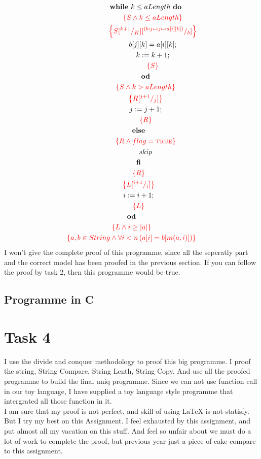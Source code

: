 \documentclass[a4paper,12pt,fleqn]{scrartcl}
\newcommand{\assn}[1]{{\color{red}\left\{#1\right\}}}
\newcommand{\variant}[3]{(#1:#2\mapsto #3)}
\newcommand{\whatever}[4]{\variant{#1}{#2\mapsto #3}{#4}}
\newcommand{\length}[1]{\left|#1\right|}
\begin{document}
\begin{gather}
    \qquad \qquad \WHILE ~k \leq aLength~ \DO\\ 
    \qquad \qquad \qquad \assn{S \And k \leq aLength}\\
    \qquad \qquad \qquad \assn{S \subst{k+1}{K} 
        \subst{\whatever{b}{j}{j}{a[i][k]} }{b}}\\
    \qquad \qquad \qquad b[j][k] = a[i][k];\\
    \qquad \qquad \qquad k \Ass k+1;\\
    \qquad \qquad \qquad \assn{S}\\
    \qquad \qquad \OD\\
    \qquad \qquad \assn{S \And k > aLength}\\
    \qquad \qquad \assn{R \subst{j+1}{j}}\\
    \qquad \qquad j \Ass j+1;\\
    \qquad \qquad \assn{R}\\
    \qquad \ELSE\\
    \qquad \qquad \assn{R \And flag = \True}\\
    \qquad \qquad skip \\
    \qquad \FI\\
    \qquad \assn{R}\\
    \qquad \assn{L \subst{i+1}{i}}\\
    \qquad i \Ass i+1;\\
    \qquad \assn{L}\\
    \OD \\
    \assn{L \And i \geq \length{a}}\\
    \assn{a,b\in String \And\All {i < n}{a[i] = b[m(a,i)]}}
\end{gather}
I won't give the complete proof of this programme, since all the seperatly part 
and the correct model has been proofed in the previous section. If you can follow
the proof by task 2, then this programme would be true.
\subsection{Programme in C}

\section{Task 4}
I use the divide and conquer methodology to proof this big programme. I proof the 
string, String Compare, String Lenth, String Copy. And use all the proofed programme
to build the final uniq programme. Since we can not use function call in our toy
language, I have supplied a toy language style programme that intergrated all those 
function in it. \\
I am sure that my proof is not perfect, and skill of using LaTeX is not statisfy. 
But I try my best on this Assignment. I feel exhausted by this assignment, and put 
almost all my vacation on this stuff. And feel so unfair about we must do a lot of 
work to complete the proof, but previous year just a piece of cake compare to this
assignment. \\ 
\end{document}
